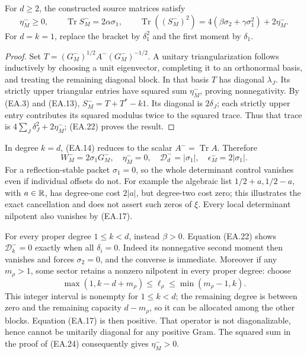 \begin{theorem}
For \(d\ge2\), the constructed source matrices satisfy
\[
 \eta_M^-\ge0,\qquad
 \operatorname{Tr}S_M^-=2\alpha\sigma_1,\qquad
 \operatorname{Tr}((S_M^-)^2)
        =4(\beta\sigma_2+\gamma\sigma_1^2)+2\eta_M^-.
 \tag{EA.24}
\]
For \(d=k=1\), replace the bracket by \(\delta_1^2\) and
the first moment by \(\delta_1\).
\end{theorem}
\begin{proof}
Set \(T=(G_M^-)^{1/2}A^-(G_M^-)^{-1/2}\).  A unitary
triangularization follows inductively by choosing a unit eigenvector,
completing it to an orthonormal basis, and treating the remaining
diagonal block.  In that basis \(T\) has diagonal \(\lambda_J\).
Its strictly upper triangular entries have squared sum \(\eta_M^-\),
proving nonnegativity.  By (EA.3) and (EA.13),
\(S_M^-=T+T^*-k1\).  Its diagonal is \(2\delta_J\);
each strictly upper entry contributes its squared modulus twice to
the squared trace.  Thus that trace is
\(4\sum_J\delta_J^2+2\eta_M^-\); (EA.22) proves the result.
\end{proof}

In degree \(k=d\), (EA.14) reduces to the scalar
\(A^-=\operatorname{Tr}A\).  Therefore
\[
 W_M^-=2\sigma_1G_M^-,\quad \eta_M^-=0,\quad
 \mathcal D_d^-=|\sigma_1|,\quad \epsilon_M^-=2|\sigma_1|.
 \tag{EA.25}
\]
For a reflection-stable packet \(\sigma_1=0\), so the whole
determinant control vanishes even if individual offsets do not.
For example the algebraic list \(1/2+a,1/2-a\), with \(a\in\mathbb R\), has degree-one
cost \(2|a|\), but degree-two cost zero; this illustrates the
exact cancellation and does not assert such zeros of \(\xi\).
Every local determinant nilpotent also vanishes by (EA.17).

For every proper degree \(1\le k<d\), instead \(\beta>0\).
Equation (EA.22) shows \(\mathcal D_k^-=0\) exactly when all
\(\delta_i=0\).  Indeed its nonnegative second moment then
vanishes and forces \(\sigma_2=0\), and the converse is immediate.
Moreover if any \(m_\rho>1\), some sector retains a nonzero
nilpotent in every proper degree: choose
\[
 \max(1,k-d+m_\rho)\le\ell_\rho\le\min(m_\rho-1,k).
 \tag{EA.26}
\]
This integer interval is nonempty for \(1\le k<d\); the remaining
degree is between zero and the remaining capacity \(d-m_\rho\),
so it can be allocated among the other blocks.  Equation (EA.17)
is then positive.  That operator is not diagonalizable, hence cannot
be unitarily diagonal for any positive Gram.  The squared sum in
the proof of (EA.24) consequently gives \(\eta_M^->0\).

